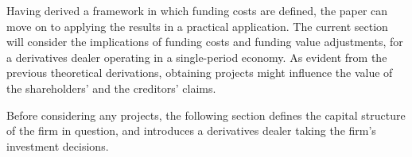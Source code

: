 \documentclass[main.tex]{subfiles}
\begin{document}
    Having derived a framework in which funding costs are defined, 
    the paper can move on to applying the results in a practical application.
    The current section will consider the implications of funding costs and funding value adjustments,
    for a derivatives dealer operating in a single-period economy.
    As evident from the previous theoretical derivations, 
    obtaining projects might influence the value of the shareholders' and the creditors' claims.

    Before considering any projects, 
    the following section defines the capital structure of the firm in question,
    and introduces a derivatives dealer taking the firm's investment decisions. 
\end{document}
